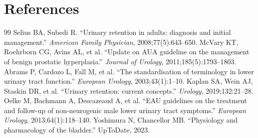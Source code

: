 \section*{References}
\begin{thebibliography}{99}
 Selius BA, Subedi R. ``Urinary retention in adults: diagnosis and initial management.'' \textit{American Family Physician}, 2008;77(5):643--650.
 McVary KT, Roehrborn CG, Avins AL, et al. ``Update on AUA guideline on the management of benign prostatic hyperplasia.'' \textit{Journal of Urology}, 2011;185(5):1793--1803.
 Abrams P, Cardozo L, Fall M, et al. ``The standardisation of terminology in lower urinary tract function.'' \textit{European Urology}, 2003;43(1):1--10.
 Kaplan SA, Wein AJ, Staskin DR, et al. ``Urinary retention: current concepts.'' \textit{Urology}, 2019;132:21--28.
 Oelke M, Bachmann A, Descazeaud A, et al. ``EAU guidelines on the treatment and follow-up of non-neurogenic male lower urinary tract symptoms.'' \textit{European Urology}, 2013;64(1):118--140.
 Yoshimura N, Chancellor MB. ``Physiology and pharmacology of the bladder.'' UpToDate, 2023.

\end{thebibliography}
